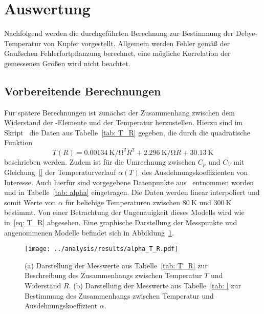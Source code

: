 \section{Auswertung}
Nachfolgend werden die durchgeführten Berechnung zur Bestimmung der Debye-Temperatur von Kupfer 
vorgestellt. Allgemein werden Fehler gemäß der Gaußschen Fehlerfortpflanzung berechnet, eine mögliche 
Korrelation der gemessenen Größen wird nicht beachtet.

\subsection{Vorbereitende Berechnungen}
Für spätere Berechnungen ist zunächst der Zusammenhang zwischen dem Widerstand der -Elemente und der Temperatur 
herzustellen. Hierzu sind im Skript~\cite{anleitung47} die Daten aus Tabelle~\ref{tab: T_R} gegeben, die durch die quadratische 
Funktion
\begin{equation}
    T(R) = \SI{0.00134}{\kelvin \per \ohm\squared} R^2 + \SI{2.296}{\kelvin \per \ohm} R + \SI{30.13}{\kelvin}
    \label{eq: T_R}
\end{equation}
beschrieben werden. Zudem ist für die Umrechnung zwischen $C_p$ und $C_V$ mit Gleichung~\eqref{} der Temperaturverlauf 
$\alpha(T)$ des Ausdehnungskoeffizienten von Interesse. Auch hierfür sind vorgegebene Datenpunkte aus~\cite{anleitung47} entnommen 
worden und in Tabelle~\ref{tab: alpha} eingetragen. Die Daten werden linear interpoliert und somit Werte von $\alpha$ für 
beliebige Temperaturen zwischen $\SI{80}{\kelvin}$ und $\SI{300}{\kelvin}$ bestimmt. Von einer Betrachtung der Ungenauigkeit 
dieses Modells wird wie in~\eqref{eq: T_R} abgesehen. Eine graphische Darstellung der Messpunkte und angenommenen 
Modelle befindet sich in Abbildung~\ref{fig: alpha_T_R}.
\begin{figure}
\centering
\texttt{[image: ../analysis/results/alpha\_T\_R.pdf]}
\caption{(a) Darstellung der Messwerte aus Tabelle~\ref{tab: T_R} zur Beschreibung des Zusammenhangs zwischen Temperatur 
        $T$ und Widerstand $R$.
        (b) Darstellung der Messwerte aus Tabelle~\ref{tab: } zur Bestimmung des Zusammenhangs zwischen Temperatur und
         Ausdehnungskoeffizient $\alpha$.}
\label{fig: alpha_T_R}
\end{figure}





